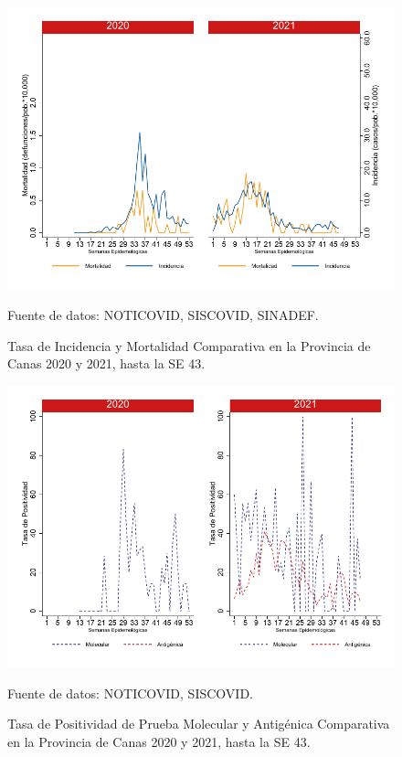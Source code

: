 \documentclass[12pt,a4paper,openany]{book}
\begin{document}
		\begin{figure}[h]
			\caption{Tasa de Incidencia y Mortalidad Comparativa en la Provincia de Canas 2020 y 2021, hasta la SE 43.}\label{fig:inc_mort_canas}
			\begin{center}
				\includegraphics[width=0.7\linewidth]{../figuras/incidencia_mortalidad_20_21_3}
			\end{center}
			{\footnotesize {Fuente de datos: NOTICOVID, SISCOVID, SINADEF.}}
		\end{figure}
		
		\begin{figure}[h]
			\caption{Tasa de Positividad de Prueba Molecular y Antigénica Comparativa en la Provincia de Canas 2020 y 2021, hasta la SE 43.}\label{fig:positividad_canas}
			\begin{center}
				\includegraphics[width=0.7\linewidth]{../figuras/positividad_20_21_3}
			\end{center}
			{\footnotesize {Fuente de datos: NOTICOVID, SISCOVID.}}
		\end{figure}
		
\end{document}
